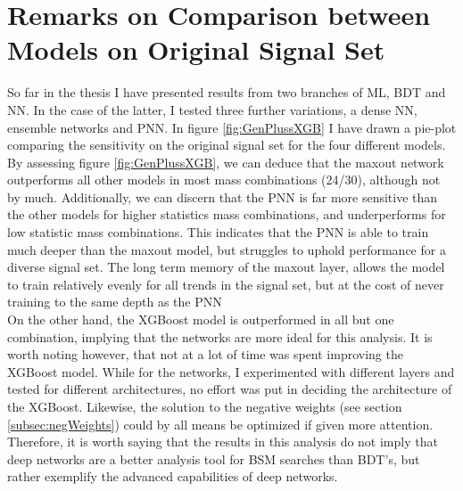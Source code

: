 \section{Remarks on Comparison between Models on Original Signal Set}
So far in the thesis I have presented results from two branches of \ac{ML}, \acf{BDT} and \acf{NN}. In the case of the latter, I tested
three further variations, a dense \ac{NN}, ensemble networks and \ac{PNN}. In figure \ref{fig:GenPlussXGB} I have drawn a pie-plot comparing 
the sensitivity on the original signal set for the four different models. By assessing figure \ref{fig:GenPlussXGB}, we can deduce that the 
maxout network outperforms all other models in most mass combinations (24/30), although not by much. Additionally, we can discern that the \ac{PNN}
is far more sensitive than the other models for higher statistics mass combinations, and underperforms for low statistic mass combinations.
This indicates that the \ac{PNN} is able to train much deeper than the maxout model, but struggles to uphold performance for a diverse signal set. 
The long term memory of the maxout layer, allows the model to train relatively evenly for all trends in the signal set, but at the cost of never 
training to the same depth as the \ac{PNN}
\\
On the other hand, the XGBoost model is outperformed in all but one combination, implying that the networks are more ideal for this analysis. 
It is worth noting however, that not at a lot of time was spent improving the XGBoost model. While for the networks, I experimented with different layers and 
tested for different architectures, no effort was put in deciding the architecture of the XGBoost. Likewise, the solution to the negative weights (see 
section \ref{subsec:negWeights}) could by all means be optimized if given more attention. Therefore, it is worth saying that the results in this analysis
do not imply that deep networks are a better analysis tool for \ac{BSM} searches than \ac{BDT}'s, but rather exemplify the advanced capabilities of deep networks.
